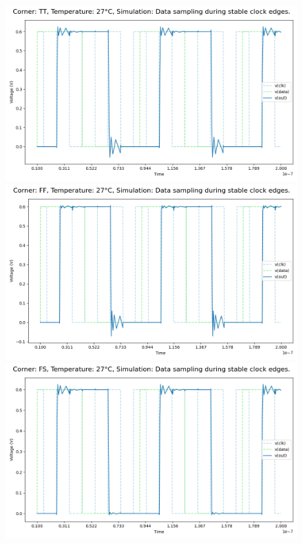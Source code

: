 \begin{figure}[H]
    \centering
    \includegraphics[height= 0.21\textheight]{figures/aimspice/TT27W2.png}
    \vspace{5pt}
    \includegraphics[height= 0.21\textheight]{figures/aimspice/FF27W2.png}
    \vspace{5pt}
    \includegraphics[height= 0.21\textheight]{figures/aimspice/FS27W2.png}

\end{figure}
